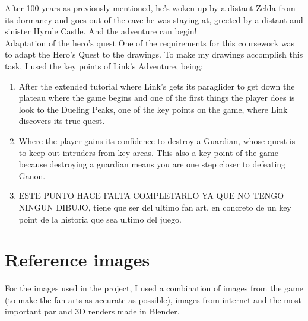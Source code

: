 \documentclass{cup-pan}
\begin{document}
    After 100 years as previously mentioned, he's woken up by a distant Zelda from its dormancy and goes out of the cave he was staying at, greeted by a distant and sinister Hyrule Castle. And the adventure can begin!\\
    
    \textcolor{PANDarkBlue}{\large Adaptation of the hero's quest}
    One of the requirements for this coursework was to adapt the Hero's Quest to the drawings.
    To make my drawings accomplish this task, I used the key points of Link's Adventure, being:\\
        \begin{enumerate}
            \item After the extended tutorial where Link's gets its paraglider to get down the plateau where the game begins and one of the first things the player does is look to the Dueling Peaks, one of the key points on the game, where Link discovers its true quest.\\
            \item Where the player gains its confidence to destroy a Guardian, whose quest is to keep out intruders from key areas. This also a key point of the game because destroying a guardian means you are one step closer to defeating Ganon. \\
            \item ESTE PUNTO HACE FALTA COMPLETARLO YA QUE NO TENGO NINGUN DIBUJO, tiene que ser del ultimo fan art, en concreto de un key point de la historia que sea ultimo del juego. \\
        \end{enumerate}


\section{Reference images}

    For the images used in the project, I used a combination of images from the game (to make the fan arts as accurate as possible), images from internet and the most important par and 3D renders made in Blender.\\
\end{document}
